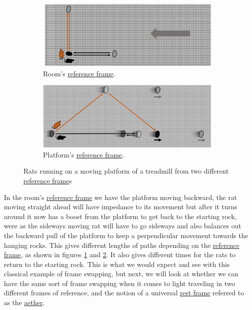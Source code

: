 \begin{figure}[htbp]
	\begin{subfigure}{.49\textwidth}
		\centering
		\includegraphics[width=\textwidth]{images/pdf/rats_moving.pdf}
		\caption{Room's \protect\hyperlink{def-Reference-frame}{reference frame}.}
		\label{fig: rat with moving platform}
	\end{subfigure}
	\begin{subfigure}{.49\textwidth}
		\centering
		\includegraphics[width=\textwidth]{images/pdf/rats_platform_frame.pdf}
		\caption{Platform's \protect\hyperlink{def-Reference-frame}{reference frame}.}
		\label{fig: rat platform reference frame}
	\end{subfigure}
	\caption{Rats running on a moving platform of a treadmill from two different \protect\hyperlink{def-Reference-frame}{reference frame}s}
	\label{fig: treadmill}
\end{figure}

In the room's \hyperlink{def-Reference-frame}{reference frame} we have the platform moving backward, the rat moving straight ahead will have impedance to its movement but after it turns around it now has a boost from the platform to get back to the starting rock, were as the sideways moving rat will have to go sideways and also balances out the backward pull of the platform to keep a perpendicular movement towards the hanging rocks. This gives different lengths of paths depending on the \hyperlink{def-Reference-frame}{reference frame}, as shown in figures \ref{fig: rat with moving platform} and \ref{fig: rat platform reference frame}. It also gives different times for the rats to return to the starting rock. This is what we would expect and see with this classical example of frame swapping, but next, we will look at whether we can have the same sort of frame swapping when it comes to light traveling in two different frames of reference, and the notion of a universal \hyperlink{def-proper-frame}{rest frame} referred to as the \hyperlink{def-aether}{aether}.

